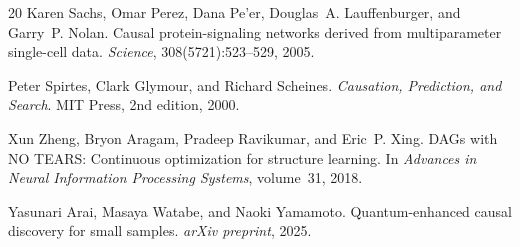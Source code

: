 \documentclass{article}
\begin{document}
\begin{thebibliography}{20}
Karen Sachs, Omar Perez, Dana Pe'er, Douglas~A. Lauffenburger, and Garry~P. Nolan.
\newblock Causal protein-signaling networks derived from multiparameter single-cell data.
\newblock \emph{Science}, 308(5721):523--529, 2005.

Peter Spirtes, Clark Glymour, and Richard Scheines.
\newblock \emph{Causation, Prediction, and Search}.
\newblock MIT Press, 2nd edition, 2000.

Xun Zheng, Bryon Aragam, Pradeep Ravikumar, and Eric~P. Xing.
\newblock DAGs with NO TEARS: Continuous optimization for structure learning.
\newblock In \emph{Advances in Neural Information Processing Systems}, volume~31, 2018.

Yasunari Arai, Masaya Watabe, and Naoki Yamamoto.
\newblock Quantum-enhanced causal discovery for small samples.
\newblock \emph{arXiv preprint}, 2025.

\end{thebibliography}
\end{document}
